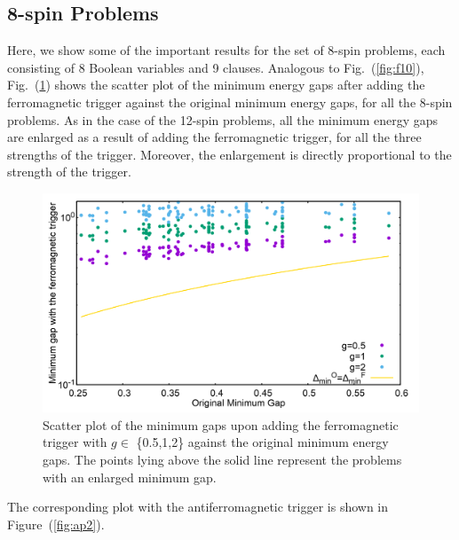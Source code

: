 \documentclass[../main.tex]{subfiles}
\begin{document}
\appendix
\begin{appendices}

\section{8-spin Problems}
Here, we show some of the important results for the set of 8-spin problems, each consisting of 8 Boolean variables and 9 clauses. Analogous to Fig.~(\ref{fig:f10}), Fig.~(\ref{fig:ap1}) shows the scatter plot of the minimum energy gaps after adding the ferromagnetic trigger against the original minimum energy gaps, for all the 8-spin problems. As in the case of the 12-spin problems, all the minimum energy gaps are enlarged as a result of adding the ferromagnetic trigger, for all the three strengths of the trigger. Moreover, the enlargement is directly proportional to the strength of the trigger.

\begin{figure}[H]
\centering 
\includegraphics[scale=0.2]{Mingap_F_8.png}
\caption{Scatter plot of the minimum gaps upon adding the ferromagnetic trigger with $g\in$ \{0.5,1,2\} against the original minimum energy gaps. The points lying above the solid line represent the problems with an enlarged minimum gap.}
\label{fig:ap1}
\end{figure}

The corresponding plot with the antiferromagnetic trigger is shown in Figure~(\ref{fig:ap2}).


\end{appendices}
\end{document}

